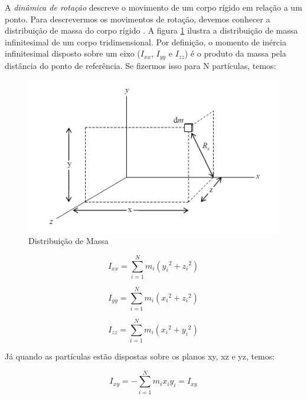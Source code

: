 A \textit{dinâmica de rotação} descreve o movimento de um corpo rígido em relação a um ponto. Para descrevermos os movimentos de rotação, devemos conhecer a distribuição de massa do corpo rígido \cite{Snider}. A figura \ref{fig:mass_snider_p16} ilustra a distribuição de massa infinitesimal de um corpo tridimensional. Por definição, o momento de inércia infinitesimal disposto sobre um eixo ($I_{xx}$, $I_{yy}$ e $I_{zz}$) é o produto da massa pela distância do ponto de referência. Se fizermos isso para N partículas, temos:

\begin{figure}[H]
  \caption{Distribuição de Massa}
  \begin{center}
      \includegraphics[scale=0.5]{referencial/img/mass_snider_p16}
  \end{center}
  \label{fig:mass_snider_p16}
\end{figure}

\begin{equation}
  I_{xx}=\sum_{i=1}^{N}{m_i({y_i}^{2}+{z_i}^{2})}
\end{equation}

\begin{equation}
  I_{yy}=\sum_{i=1}^{N}{m_i({x_i}^{2}+{z_i}^{2})}
\end{equation}

\begin{equation}
  I_{zz}=\sum_{i=1}^{N}{m_i({x_i}^{2}+{y_i}^{2})}
\end{equation}

Já quando as partículas estão dispostas sobre os planos xy, xz e yz, temos:

\begin{equation}
  I_{xy}=-\sum_{i=1}^{N}{m_ix_iy_i}=I_{xy}
\end{equation}

